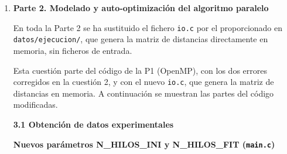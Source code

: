 \documentclass[12pt]{article}
\begin{document}
\begin{enumerate}
\begin{itemize}
    \item \textbf{Diferencia con convergencia.} Con convergencia la versión híbrida sale peor que la P1, y con 1 proceso y 1 hilo incluso más lenta que el secuencial (5.14 s frente a 3.98 s). No es porque sea menos eficiente: la P1 comprueba la convergencia en cada generación, mientras que la versión con islas solo puede hacerlo en cada migración, cada NGM = 10 generaciones, y por tanto hace más generaciones antes de parar. Por eso, para comparar el rendimiento de las implementaciones, la medida fiable es la de trabajo fijo, y la de convergencia sirve para ver el compromiso entre tiempo y fitness.
\end{itemize}

En resumen, en este sistema la mejor configuración de la versión híbrida es 1 proceso con 12 hilos, que es más de 3 veces más rápida que el secuencial, el doble de rápida que la mejor versión de la P2 y tan rápida como la mejor de la P1.


\newpage
\item[] \textbf{\large Parte 2. Modelado y auto-optimización del algoritmo paralelo}

En toda la Parte 2 se ha sustituido el fichero \texttt{io.c} por el proporcionado en \texttt{datos/ejecucion/}, que genera la matriz de distancias directamente en memoria, sin ficheros de entrada.


Esta cuestión parte del código de la P1 (OpenMP), con los dos errores corregidos en la cuestión 2, y con el nuevo \texttt{io.c}, que genera la matriz de distancias en memoria. A continuación se muestran las partes del código modificadas.

\medskip
\noindent\textbf{3.1 Obtención de datos experimentales}\par
\smallskip


\medskip
\noindent\textbf{Nuevos parámetros N\_HILOS\_INI y N\_HILOS\_FIT (\texttt{main.c})}\par
\smallskip


\end{enumerate}
\end{document}
